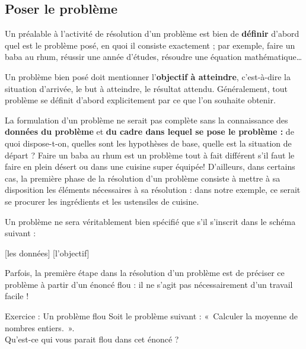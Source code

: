 	\subsection{Poser le problème}
	
		Un préalable à l’activité de résolution d’un problème est bien de
		\textbf{définir} d’abord quel est le problème posé, en quoi il consiste
		exactement ; par exemple, faire un baba au rhum, réussir une année
		d’études, résoudre une équation mathématique…
		
		Un problème bien posé doit mentionner l’\textbf{objectif à atteindre},
		c’est-à-dire la situation d’arrivée, le but à atteindre, le résultat
		attendu. Généralement, tout problème se définit d’abord explicitement
		par ce que l’on souhaite obtenir.
		
		La formulation d’un problème ne serait pas complète sans la connaissance
		des \textbf{données du problème} et \textbf{du cadre dans lequel se
		pose le problème :} de quoi dispose-t-on, quelles sont les hypothèses
		de base, quelle est la situation de départ ? Faire un baba au rhum est
		un problème tout à fait différent s’il faut le faire en plein désert ou
		dans une cuisine super équipée! D’ailleurs, dans certains cas, la
		première phase de la résolution d’un problème consiste à mettre à sa
		disposition les éléments nécessaires à sa résolution : dans notre
		exemple, ce serait se procurer les ingrédients et les ustensiles de
		cuisine.
	
		Un problème ne sera véritablement bien spécifié que s’il s’inscrit dans
		le schéma suivant :
		
		\begin{center}
		\begin{Ovalbox}
		{ [les données]  [l’objectif]}
		\end{Ovalbox}
		\end{center}
	
		Parfois, la première étape dans la résolution d’un problème est de
		préciser ce problème à partir d’un énoncé flou : il ne s’agit pas
		nécessairement d’un travail facile !

		\begin{Emphase}[exercice]{Exercice : Un problème flou}
			Soit le problème suivant : «~Calculer la moyenne de nombres entiers.~».
			\\Qu'est-ce qui vous parait flou dans cet énoncé ?
		\end{Emphase}


